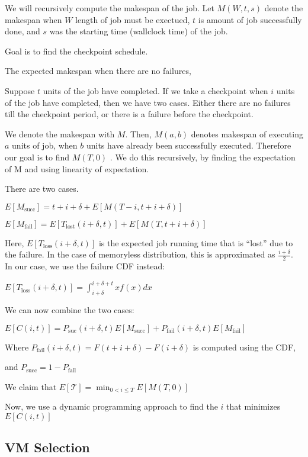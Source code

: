 We will recursively compute the makespan of the job.
Let $M(W, t, s)$ denote the makespan when $W$ length of job must be exectued, $t$ is amount of job successfully done, and $s$ was the starting time (wallclock time) of the job.


Goal is to find the checkpoint schedule.

The expected makespan when there are no failures,

Suppose $t$ units of the job have completed. 
If we take a checkpoint when $i$ units of the job have completed, then we have two cases.
Either there are no failures till the checkpoint period, or there is a failure before the checkpoint.

We denote the makespan with $M$.
Then, $M(a, b)$ denotes makespan of executing $a$ units of job, when $b$ units have already been successfully executed.
Therefore our goal is to find $M(T,0)$ .
We do this recursively, by finding the expectation of M and using linearity of expectation. 

There are two cases. 

$E[M_{\text{succ}}] = t+i+\delta + E[M(T-i, t+i+\delta)]$

$E[M_{\text{fail}}] = E[T_{\text{lost}}(i+\delta, t)] + E[M(T, t+i+\delta)]$

Here, $E[T_{\text{loss}}(i+\delta, t)]$ is the expected job running time that is ``lost'' due to the failure. In the case of memoryless distribution, this is approximated as $\frac{i+\delta}{2}$.
In our case, we use the failure CDF instead:

$E[T_{\text{loss}}(i+\delta, t)] = \int_{i+\delta}^{i+\delta+t}{xf(x)dx} $

We can now combine the two cases: 

$E[{C(i, t)}] = P_{\text{suc}}(i+\delta, t)E[M_{\text{succ}}] + P_{\text{fail}}(i+\delta, t)E[M_{\text{fail}}]$


Where $P_{\text{fail}}(i+\delta,t) = F(t+i+\delta)-F(i+\delta)$ is computed using the CDF, 

and $P_{\text{succ}} = 1 - P_{\text{fail}}$ 

We claim that $E[\mathcal{T}] = \min_{0 < i \leq T}{E[M(T,0)]}$


Now, we use a dynamic programming approach to find the $i$ that minimizes $E[C(i,t)]$



\subsection{VM Selection}

